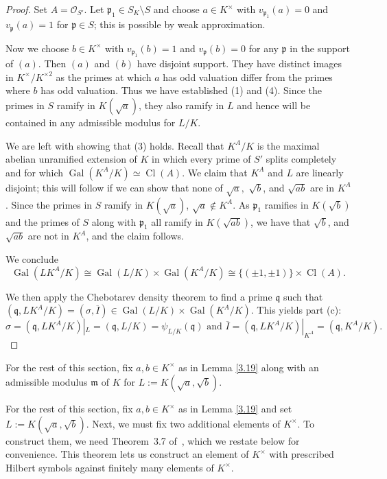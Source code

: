 \documentclass[12pt,reqno]{amsart}
\newcommand{\qq}{\mathfrak{q}}
\newcommand{\mm}{\mathfrak{m}}
\newcommand{\OO}{\mathcal{O}}
\newcommand{\pp}{\mathfrak{p}}
\DeclareMathOperator{\Gal}{Gal}
\DeclareMathOperator{\Cl}{Cl}
\theoremstyle{definition}
\begin{document}
\begin{proof}
Set $A=\OO_{S'}$. Let $\pp_1\in S_K\setminus S$ and choose $a\in K^{\times}$ with $v_{\pp_1}(a)=0$ and $v_{\pp}(a)=1$ for $\pp\in S$; this is possible by weak approximation. 

Now we choose $b\in K^{\times}$ with $v_{\pp_1}(b)=1$ and $v_{\pp}(b)=0$ for any $\pp$ in the support of $(a)$. Then $(a)$ and $(b)$ have disjoint support. They have distinct images in $K^{\times}/K^{\times2}$ as the primes at which $a$ has odd valuation differ from the primes where $b$ has odd valuation. Thus we have established (1) and (4). Since the primes in $S$ ramify in $K(\sqrt{a})$, they also ramify in $L$ and hence will be contained in any admissible modulus for $L/K$. 

We are left with showing that (3) holds. Recall that $K^A/K$ is the maximal abelian unramified extension of $K$ in which every prime of $S'$ splits completely and for which $\Gal(K^A/K)\simeq \Cl(A)$. We claim that $K^A$ and $L$ are linearly disjoint; this will follow if we can show that none of $\sqrt{a},$ $\sqrt{b}$, and $\sqrt{ab}$ are in $K^A$. Since the primes in $S$ ramify in $K(\sqrt{a})$, $\sqrt{a}\not\in K^A$. As $\pp_1$ ramifies in $K(\sqrt{b})$ and the primes of $S$ along with $\pp_1$ all ramify in $K(\sqrt{ab})$, we have that $\sqrt{b}$, and $\sqrt{ab}$ are not in $K^A$, and the claim follows. 

We conclude 
\[
\Gal(LK^A/K)\cong\Gal(L/K)\times\Gal(K^A/K)\cong \{(\pm1,\pm1)\}\times\Cl(A).
\]

We then apply the Chebotarev density theorem to find a prime $\qq$
such that \linebreak $(\qq,LK^A/K)=(\sigma,\overline{I})\in
\Gal(L/K)\times\Gal(K^A/K)$. This yields part (c): 
\[ \sigma=(\qq,LK^A/K)|_L=(\qq,L/K)=\psi_{L/K}(\qq) {\text{ and }} \overline{I}=(\qq,LK^A/K)|_{K^A}=(\qq,K^A/K).\]


\end{proof}
For the rest of this section, fix $a,b\in K^{\times}$ as in Lemma
\ref{3.19} along with an admissible modulus $\mm$ of $K$ for
$L:=K(\sqrt{a},\sqrt{b})$.

For the rest of this section, fix $a,b\in K^{\times}$ as in Lemma
\ref{3.19} and set $L:=K(\sqrt{a},\sqrt{b})$. Next, we must fix two
additional elements of $K^{\times}$. To construct them, we need
Theorem~3.7 of~\cite{Park}, which we restate below for
convenience. This theorem lets us construct an element of $K^{\times}$
with prescribed Hilbert symbols against finitely many elements of
$K^{\times}$. 
\end{document}
